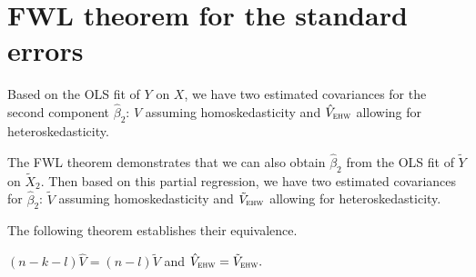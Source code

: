 %
%
%



\section{FWL theorem for the standard errors}

Based on the OLS fit of $Y$ on $X$, we have two estimated covariances for the second component $ \hat{\beta}_2$: $\hat{V}$ assuming homoskedasticity and $\hat{V}_{\textsc{ehw}}$
allowing for heteroskedasticity.

The FWL theorem demonstrates that we can also obtain $ \hat{\beta}_2$ from the OLS fit of $\tilde{Y}$ on $\tilde{X}_2$. Then based on this partial regression, we have two estimated covariances for $ \hat{\beta}_2$: 
$
\tilde{V}  
$ 
assuming homoskedasticity and 
$
\tilde{V}_{\textsc{ehw}}  
$
 allowing for heteroskedasticity. 
 
 The following theorem establishes their equivalence. 
 
 
 \begin{theorem}
 \label{thm::fwl-se}
 $(n-k-l)\hat{V} = (n-l)  \tilde{V} $ and $\hat{V}_{\textsc{ehw}} = \tilde{V}_{\textsc{ehw}}.$
 \end{theorem}
 
